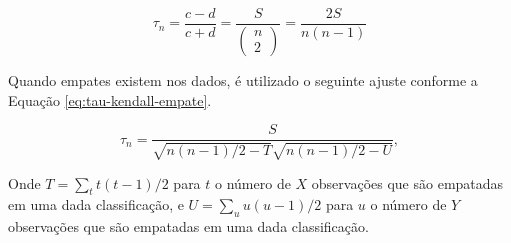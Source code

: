 \begin{equation} 
\tau _ { n } = \frac { c - d } { c + d } = \frac { S } { \left( \begin{array} { l } { n } \\ { 2 } \end{array} \right) } = \frac { 2 S } { n ( n - 1 ) }
\label{eq:tau-kendall}
\end{equation}

Quando empates existem nos dados, é utilizado o seguinte ajuste conforme a Equação \ref{eq:tau-kendall-empate}.

\begin{equation} 
\tau _ { n } = \frac { S } { \sqrt { n ( n - 1 ) / 2 - T } \sqrt { n ( n - 1 ) / 2 - U } }, \label{eq:tau-kendall-empate}
\end{equation}

Onde $T = \sum _ { t } t ( t - 1 ) / 2$  para $t$ o número de $X$ observações que são empatadas em uma dada classificação, e $U = \sum _ { u } u ( u - 1 ) / 2$ para $u$ o número de $Y$ observações que são empatadas em uma dada classificação. 



